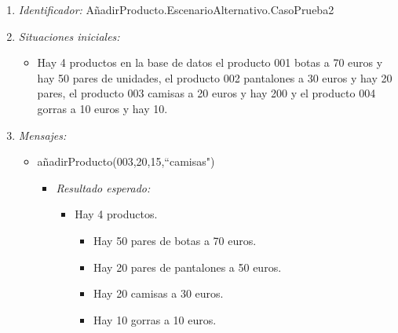 \begin{enumerate}
\item {\it Identificador:} AñadirProducto.EscenarioAlternativo.CasoPrueba2
\item {\it Situaciones iniciales:}
  \begin{itemize}
  \item Hay 4 productos en la base de datos el producto 001 botas a 70 euros y hay 50 pares de unidades, el producto 002 pantalones a 30 euros y hay 20 pares, el producto 003 camisas a 20 euros y hay 200 y el producto 004 gorras a 10 euros y hay 10.
  \end{itemize}
\item {\it Mensajes:}
  \begin{itemize}
  \item añadirProducto(003,20,15,``camisas")
    \begin{itemize}
    \item {\it Resultado esperado:}
      \begin{itemize}
      \item Hay 4 productos.
        \begin{itemize}
        \item Hay 50 pares de botas a 70 euros.
        \item Hay 20 pares de pantalones a 50 euros.
        \item Hay 20 camisas a 30 euros.
        \item Hay 10 gorras a 10 euros.
        \end{itemize}
      \end{itemize}
    \end{itemize}
  \end{itemize}


\end{enumerate}

